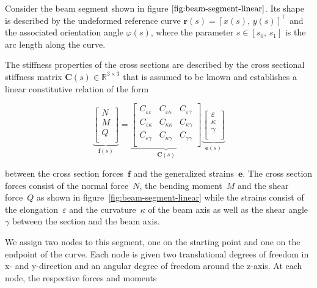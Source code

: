 Consider the beam segment shown in figure $\ref{fig:beam-segment-linear}$.
Its shape is described by the undeformed reference curve $\boldsymbol{r}(s) = \left[x(s),\,y(s)\right]^\intercal$ and the associated orientation angle $\varphi(s)$, where the parameter $s \in [s_0,\,s_1]$ is the arc length along the curve.

The stiffness properties of the cross sections are described by the cross sectional stiffness matrix $\boldsymbol{C}(s) \in \mathbb{R}^{3 \times 3}$ that is assumed to be known and establishes a linear constitutive relation of the form

\begin{equation}
\underbrace{
\begin{bmatrix}
N \\
M \\
Q \\
\end{bmatrix}
}_{\boldsymbol{f}(s)}
=
\underbrace{
\begin{bmatrix}
C_{\varepsilon\varepsilon} & C_{\varepsilon\kappa} & C_{\varepsilon\gamma} \\
C_{\varepsilon\kappa} & C_{\kappa\kappa} & C_{\kappa\gamma} \\
C_{\varepsilon\gamma} & C_{\kappa\gamma} & C_{\gamma\gamma} \\
\end{bmatrix}
}_{\boldsymbol{C}(s)}
\underbrace{
\begin{bmatrix}
\varepsilon \\
\kappa \\
\gamma \\
\end{bmatrix}
}_{\boldsymbol{e}(s)} \label{eq:section-stiffness-matrix}
\end{equation}

between the cross section forces~$\boldsymbol{f}$ and the generalized strains~$\boldsymbol{e}$.
The cross section forces consist of the normal force~$N$, the bending moment~$M$ and the shear force~$Q$ as shown in figure~\ref{fig:beam-segment-linear} while the strains consist of the elongation~$\varepsilon$ and the curvature~$\kappa$ of the beam axis as well as the shear angle~$\gamma$ between the section and the beam axis.

We assign two nodes to this segment, one on the starting point and one on the endpoint of the curve.
Each node is given two translational degrees of freedom in x- and y-direction and an angular degree of freedom around the z-axis.
At each node, the respective forces and moments

